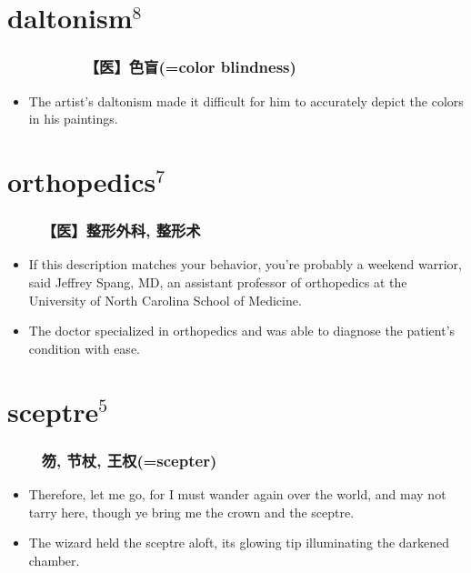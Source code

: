 \documentclass[UTF8,4pt,a3paper,space]{article}
\begin{document}
\begin{multicols}{4}
\section{daltonism$^8$}
\subsubsection*{\ \ \ \ \ \ \ \ \ 【医】色盲(=color blindness)}\begin{itemize}
\itemsep-0.5em
    \item The artist's daltonism made it difficult for him to accurately depict the colors in his paintings. 
\end{itemize}
\hrulefill


\section{orthopedics$^7$}
\subsubsection*{\ \ \ \ 【医】整形外科, 整形术}\begin{itemize}
\itemsep-0.5em
    \item If this description matches your behavior, you're probably a weekend warrior, said Jeffrey Spang, MD, an assistant professor of orthopedics at the University of North Carolina School of Medicine.    \item The doctor specialized in orthopedics and was able to diagnose the patient's condition with ease. 
\end{itemize}
\hrulefill


\section{sceptre$^5$}
\subsubsection*{\ \ \ \ 笏, 节杖, 王权(=scepter)}\begin{itemize}
\itemsep-0.5em
    \item Therefore, let me go, for I must wander again over the world, and may not tarry here, though ye bring me the crown and the sceptre.    \item The wizard held the sceptre aloft, its glowing tip illuminating the darkened chamber. 
\end{itemize}
\hrulefill



\end{multicols}
\end{document}
